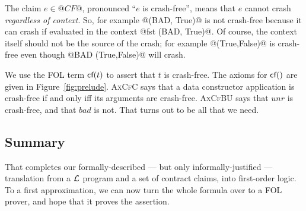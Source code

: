 The claim $e \in @CF@$, pronounced ``$e$ is crash-free'', means that $e$ cannot
crash \emph{regardless of context}.  So, for example @(BAD, True)@ is not crash-free
because it can crash if evaluated in the context @fst (BAD, True)@.  Of course,
the context itself should not be the source of the crash; for example @(True,False)@ is
crash-free even though @BAD (True,False)@ will crash.

We use the FOL term $\textsf{cf}(t)$ to assert that $t$ is crash-free. The axioms for $\textsf{cf}()$
are given in Figure~\ref{fig:prelude}.  \textsc{AxCfC} says that a data constructor application
is crash-free if and only iff its arguments are crash-free.  \textsc{AxCfBU} says that
$unr$ is crash-free, and that $bad$ is not.  That turns out to be all that we need.

\subsection{Summary}

That completes our formally-described --- but only informally-justified --- translation
from a $\cal L$ program and a set of contract claims, into first-order logic.
To a first approximation, we can now turn the whole formula over to a FOL prover,
and hope that it proves the assertion.


